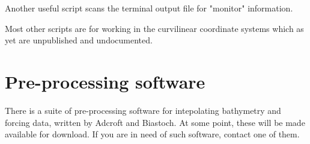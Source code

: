 Another useful script scans the terminal output file for "monitor" information.

Most other scripts are for working in the curvilinear coordinate systems which
as yet are unpublished and undocumented.

\section{Pre-processing software}

There is a suite of pre-processing software for intepolating bathymetry
and forcing data, written by Adcroft and Biastoch. At some point,
these will be made available for download. If you are in need of such
software, contact one of them.
